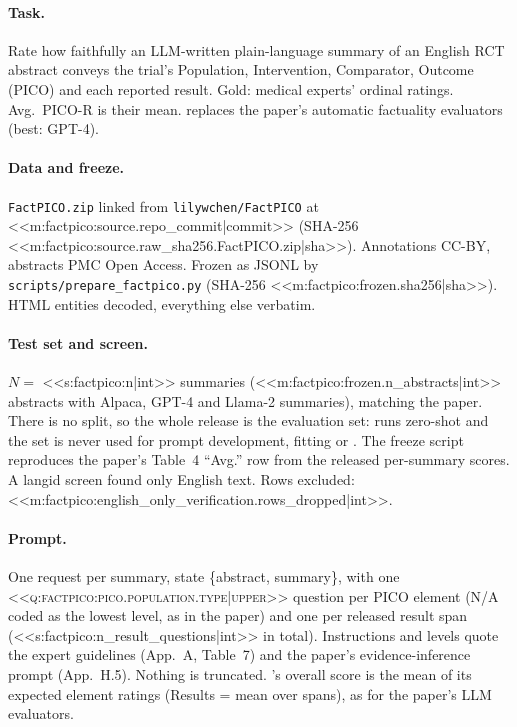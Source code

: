 \paragraph{Task.} Rate how faithfully an LLM-written plain-language summary of an English RCT abstract conveys the
trial's Population, Intervention, Comparator, Outcome (PICO) and each reported result. Gold: medical experts' ordinal
ratings. Avg.\ PICO-R is their mean. \jev{} replaces the paper's automatic factuality evaluators (best: GPT-4).

\paragraph{Data and freeze.} \texttt{FactPICO.zip} linked from \texttt{lilywchen/FactPICO} at
<<m:factpico:source.repo_commit|commit>> (SHA-256 <<m:factpico:source.raw_sha256.FactPICO.zip|sha>>). Annotations
CC-BY, abstracts PMC Open Access. Frozen as JSONL by \texttt{scripts/\allowbreak{}prepare\_factpico.py} (SHA-256 <<m:factpico:frozen.sha256|sha>>). HTML entities
decoded, everything else verbatim.

\paragraph{Test set and screen.} $N=$ <<s:factpico:n|int>> summaries
(<<m:factpico:frozen.n_abstracts|int>> abstracts with Alpaca, GPT-4 and Llama-2 summaries), matching the paper. There is no split, so the
whole release is the evaluation set: \jev{} runs zero-shot and the set is never used for prompt development, fitting
or \jevopt{}. The freeze script reproduces the paper's Table~4 ``Avg.'' row from the released per-summary scores. A
langid screen found only English text. Rows excluded: <<m:factpico:english_only_verification.rows_dropped|int>>.

\paragraph{Prompt.} One request per summary, state \{abstract, summary\}, with one
\textsc{<<q:factpico:pico.population.type|upper>>} question per PICO element (N/A coded as the lowest level, as in
the paper) and one per released result span (<<s:factpico:n_result_questions|int>> in total). Instructions and
levels quote the expert guidelines (App.~A, Table~7) and the paper's evidence-inference prompt (App.~H.5). Nothing
is truncated. \jev{}'s overall score is the mean of its expected element ratings (Results = mean over spans),
as for the paper's LLM evaluators.

